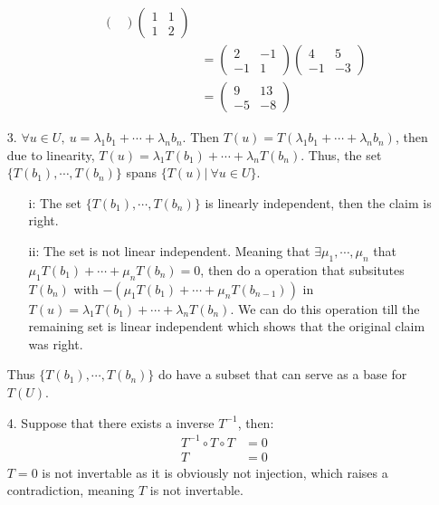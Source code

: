 \documentclass{article}
\begin{document}
\begin{itemize}
\begin{itemize}
\begin{align*}
\begin{pmatrix}
            \end{pmatrix}
            \begin{pmatrix}
                1&1\\
                1&2
            \end{pmatrix}\\
            &=\begin{pmatrix}
                2&-1\\
                -1&1
            \end{pmatrix}
            \begin{pmatrix}
                4&5\\-1&-3
            \end{pmatrix}\\
            &=\begin{pmatrix}
                9&13\\
                -5&-8
            \end{pmatrix}
        \end{align*}
    \end{itemize}
    \item [3.] \(\forall u\in U,\ u = \lambda_1 b_1+\cdots+\lambda_n b_n\). Then \(T(u) = T(\lambda_1 b_1+\cdots+\lambda_n b_n)\), then due to linearity, \(T(u) = \lambda_1T( b_1)+\cdots+\lambda_nT( b_n)\). Thus, the set \(\{T( b_1),\cdots,T( b_n)\}\) spans \(\{T(u)|\ \forall u\in U\}\).
    \begin{itemize}
        \item [i:] The set \(\{T( b_1),\cdots,T( b_n)\}\) is linearly independent, then the claim is right.
        \item [ii:] The set is not linear independent. Meaning that \(\exists \mu_1,\cdots,\mu_n\) that \(\mu_1T(b_1)+\cdots+\mu_nT( b_n) = 0\), then do a operation that subsitutes \(T(b_n)\) with \(-(\mu_1T(b_1)+\cdots+\mu_nT( b_{n-1}))\) in \(T(u) = \lambda_1T( b_1)+\cdots+\lambda_nT( b_n)\). We can do this operation till the remaining set is linear independent which shows that the original claim was right.
    \end{itemize}
    Thus \(\{T( b_1),\cdots,T( b_n)\}\) do have a subset that can serve as a base for \(T(U)\).
    \item [4.]
    Suppose that there exists a inverse \(T^{-1}\), then: \begin{align*}
        T^{-1}\circ T\circ T &= 0 \\
        T&=0
    \end{align*}
    \(T=0\) is not invertable as it is obviously not injection, which raises a contradiction, meaning \(T\) is not invertable.

\end{itemize}
\end{document}
